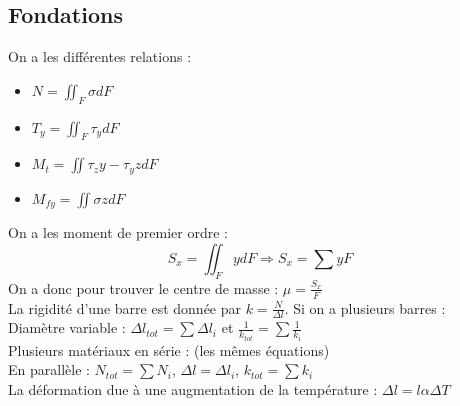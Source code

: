 \documentclass[../main.tex]{subfiles}
\begin{document}
\localtableofcontents
\subsection{Fondations}
On a les différentes relations : \\
\begin{itemize}
    \item $N = \iint_F \sigma dF$\\
    \item $T_y = \iint_F \tau_y dF$\\
    \item $M_t = \iint \tau_z y - \tau_y z dF$\\
    \item $M_{fy} = \iint \sigma z dF$\\
\end{itemize}
On a les moment de premier ordre : \\
\begin{equation}
    S_x = \iint_F ydF \Rightarrow S_x = \sum yF
\end{equation}
On a donc pour trouver le centre de masse : $\mu = \frac{S_x}{F}$\\
La rigidité d'une barre est donnée par $k = \frac{N}{\Delta l}$. Si on a plusieurs barres : \\
Diamètre variable : $\Delta l_{tot} = \sum \Delta l_i$ et $\frac{1}{k_{tot}} = \sum \frac{1}{k_i}$\\
Plusieurs matériaux en série : (les mêmes équations)\\
En parallèle : $N_{tot} = \sum N_i$, $\Delta l = \Delta l_i$, $k_{tot} = \sum k_i$\\

La déformation due à une augmentation de la température : $\Delta l = l \alpha \Delta T$\\
\end{document}
